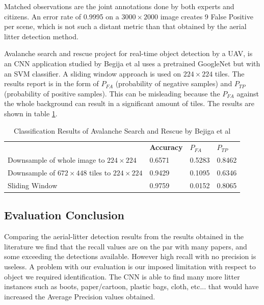 \documentclass{IEEEtran}
\begin{document}
Matched observations are the joint annotations done by both experts and citizens. An error rate of 0.9995 on a $3000 \times 2000$ image creates 9 False Positive per scene, which is not such a distant metric than that obtained by the aerial litter detection method.


Avalanche search and rescue project for real-time object detection by a UAV, is an CNN application studied by Begija et al \cite{Bejiga2016} uses a pretrained GoogleNet \cite{Szegedy2015} but with an SVM classifier. A sliding window approach is used on $224 \times 224$ tiles. The results report is in the form of $P_{FA}$ (probability of negative samples) and $P_{TP}$ (probability of positive samples). This can be misleading because the $P_{FA}$ against the whole background can result in a significant amount of tiles. The results are shown in table \ref{skiing}. 

\begin{table}[ht]
\centering
\caption{Classification Results of Avalanche Search and Rescue by Bejiga et al \cite{Bejiga2016}}
\label{skiing}
\begin{tabular}{llll}
\textbf{}                                                 & \textbf{Accuracy} & \textbf{$P_{FA}$} & \textbf{$P_{TP}$} \\
Downsample of whole image to $224 \times 224$             & 0.6571            & 0.5283          & 0.8462          \\
Downsample of $672 \times 448$ tiles to  $224 \times 224$ & 0.9429            & 0.1095          & 0.6346          \\
Sliding Window                                            & 0.9759            & 0.0152          & 0.8065         
\end{tabular}
\end{table}

\subsection{Evaluation Conclusion}

Comparing the aerial-litter detection results from the results obtained in the literature we find that the recall values are on the par with many papers, and some exceeding the detections available. However high recall with no precision is useless. A problem with our evaluation is our imposed limitation with respect to object we required identification. The CNN is able to find many more litter instances such as boots, paper/cartoon, plastic bags, cloth, etc... that would have increased the Average Precision values obtained. \newline
\end{document}
